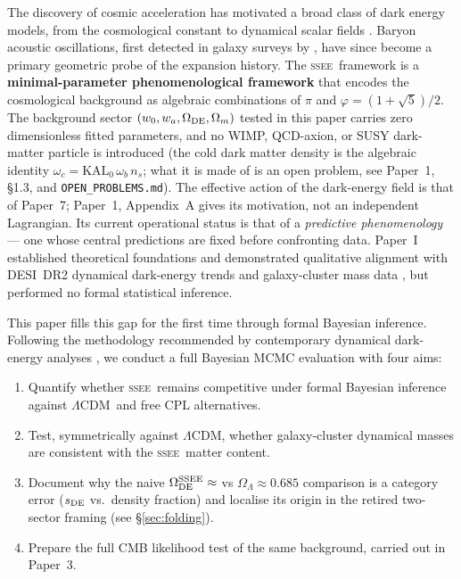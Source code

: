 \documentclass[12pt,a4paper]{article}
\newcommand{\SSEE}{\ifmmode\mathrm{SSEE}\else\textsc{ssee}\fi}
\newcommand{\LCDM}{\ifmmode\Lambda\mathrm{CDM}\else$\Lambda$CDM\fi}
\newcommand{\OmDE}{\Omega_{\mathrm{DE}}}
\begin{document}
The discovery of cosmic acceleration \citep{Perlmutter1999,Riess1998} has motivated
a broad class of dark energy models, from the cosmological constant to dynamical
scalar fields \citep{Weinberg2013,Clifton2012}.
Baryon acoustic oscillations, first detected in galaxy surveys by \citet{Eisenstein2005},
have since become a primary geometric probe of the expansion history.
The \SSEE\ framework \citep{SSEE_paperI} is a
\textbf{minimal-parameter phenomenological framework} that encodes the
cosmological background as algebraic combinations of $\pi$ and
$\varphi=(1+\sqrt{5})/2$.
The background sector $(w_0,w_a,\Omega_{\rm DE},\Omega_m)$ tested in this
paper carries zero dimensionless fitted parameters, and no WIMP, QCD-axion, or SUSY
dark-matter particle is introduced (the cold dark matter density is the algebraic
identity $\omega_c=\mathrm{KAL_0}\,\omega_b\,n_s$; what it is made of is an open problem,
see Paper~1, \S1.3, and \texttt{OPEN\_PROBLEMS.md}).
The effective action of the dark-energy field is that of Paper~7; Paper~1,
Appendix~A gives its motivation, not an independent Lagrangian.
Its current operational status is that of a
\emph{predictive phenomenology} — one whose central predictions are
fixed before confronting data.
Paper~I established theoretical foundations and demonstrated qualitative
alignment with DESI~DR2 dynamical dark-energy trends \citep{DESI_DR2}
and galaxy-cluster mass data \citep{Zhang2026}, but performed no formal
statistical inference.

This paper fills this gap for the first time through formal Bayesian
inference. Following the methodology recommended by contemporary
dynamical dark-energy analyses \citep{DESI_DR2,Moresco2017}, we conduct a
full Bayesian MCMC evaluation with four aims:
\begin{enumerate}
  \item Quantify whether \SSEE\ remains competitive under formal
    Bayesian inference against \LCDM\ and free CPL alternatives.
  \item Test, symmetrically against \LCDM, whether galaxy-cluster dynamical
    masses are consistent with the \SSEE\ matter content.
  \item Document why the naive $\OmDE^{\SSEE}\approx\val{S_DE_d3}$ vs
    $\Omega_\Lambda\approx0.685$ comparison is a category error
    ($s_{\rm DE}$ vs.\ density fraction) and localise its origin in the
    retired two-sector framing (see \S\ref{sec:folding}).
  \item Prepare the full CMB likelihood test of the same background, carried
    out in Paper~3.
\end{enumerate}
\end{document}
